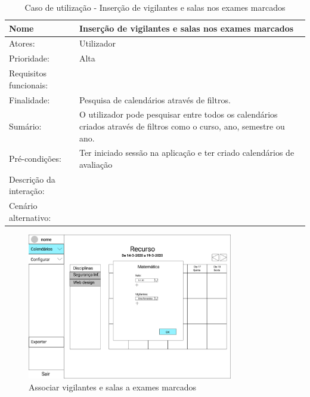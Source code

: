 \documentclass[11pt, twoside]{report}
\begin{document}
\begin{table}[H]
	\caption{Caso de utilização - Inserção de vigilantes e salas nos exames marcados}
	\begin{center}	
		\begin{tabularx}{\textwidth}{|l|X|}
			\hline
			\textbf{Nome }	& \textbf{Inserção de vigilantes e salas nos exames marcados} \\
			\hline
			Atores: & Utilizador\\
			\hline
			Prioridade: &  Alta\\
			\hline
			Requisitos funcionais:&  \\
			\hline
			Finalidade: & Pesquisa de calendários através de filtros.\\
			\hline
			Sumário: & O utilizador pode pesquisar entre todos os calendários criados através de filtros como o curso, ano, semestre ou ano.\\
			\hline
			Pré-condições: & Ter iniciado sessão na aplicação e ter criado calendários de avaliação\\
			\hline
			Descrição da interação: &  \\
			\hline
			Cenário alternativo: &\\
			\hline
		\end{tabularx}
	\end{center}
\end{table}

	\begin{figure}[H] 
	\centering 
	\includegraphics[width=0.8\textwidth,height=0.8\textheight,keepaspectratio]{image/prototipowireframes/popup}
	\caption{Associar vigilantes e salas a exames marcados}
\end{figure}
\end{document}
